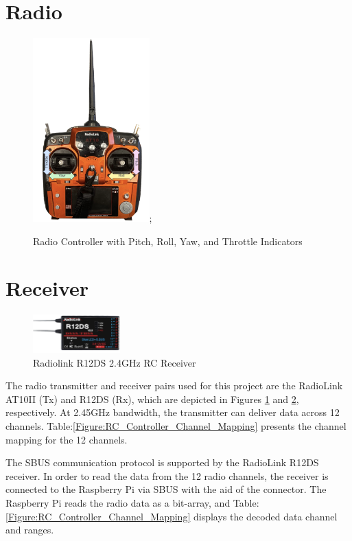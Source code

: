 \documentclass{report}
\begin{document}
\section{Radio}\label{radio}
\begin{figure}[H]
  \centering
  \includegraphics[width=0.4\textwidth]{Pictures/radio.jpg};
  \caption{Radio Controller with Pitch, Roll, Yaw, and Throttle Indicators}
  \label{fig:radio_controller}
\end{figure}
\section{Receiver}
\begin{figure}[H]
  \centering
  \includegraphics[width=0.3\textwidth]{Pictures/reciever.png}
  \caption{Radiolink R12DS 2.4GHz RC Receiver}
  \label{fig:receiver}
\end{figure}
The radio transmitter and receiver pairs used for this project are the RadioLink
AT10II (Tx) and R12DS (Rx), which are depicted in Figures
\ref{fig:radio_controller} and \ref{fig:receiver}, respectively. At 2.45GHz
bandwidth, the transmitter can deliver data across 12 channels.
Table:\ref{Figure:RC_Controller_Channel_Mapping} presents the channel mapping
for the 12 channels.

The SBUS communication protocol is supported by the RadioLink R12DS receiver. In
order to read the data from the 12 radio channels, the receiver is connected to
the Raspberry Pi via SBUS with the aid of the connector. The Raspberry Pi reads
the radio data as a bit-array, and
Table:\ref{Figure:RC_Controller_Channel_Mapping} displays the decoded data
channel and ranges.
\end{document}

